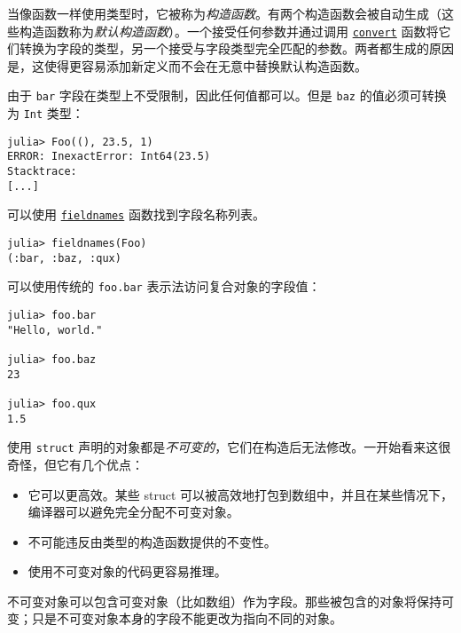当像函数一样使用类型时，它被称为\emph{构造函数}。有两个构造函数会被自动生成（这些构造函数称为\emph{默认构造函数}）。一个接受任何参数并通过调用 \hyperlink{1846942650946171605}{\texttt{convert}} 函数将它们转换为字段的类型，另一个接受与字段类型完全匹配的参数。两者都生成的原因是，这使得更容易添加新定义而不会在无意中替换默认构造函数。



由于 \texttt{bar} 字段在类型上不受限制，因此任何值都可以。但是 \texttt{baz} 的值必须可转换为 \texttt{Int} 类型：




\begin{verbatim}
julia> Foo((), 23.5, 1)
ERROR: InexactError: Int64(23.5)
Stacktrace:
[...]
\end{verbatim}



可以使用 \hyperlink{17481253338332315021}{\texttt{fieldnames}} 函数找到字段名称列表。




\begin{verbatim}
julia> fieldnames(Foo)
(:bar, :baz, :qux)
\end{verbatim}



可以使用传统的 \texttt{foo.bar} 表示法访问复合对象的字段值：




\begin{verbatim}
julia> foo.bar
"Hello, world."

julia> foo.baz
23

julia> foo.qux
1.5
\end{verbatim}



使用 \texttt{struct} 声明的对象都是\emph{不可变的}，它们在构造后无法修改。一开始看来这很奇怪，但它有几个优点：



\begin{itemize}
\item 它可以更高效。某些 struct 可以被高效地打包到数组中，并且在某些情况下，编译器可以避免完全分配不可变对象。


\item 不可能违反由类型的构造函数提供的不变性。


\item 使用不可变对象的代码更容易推理。

\end{itemize}


不可变对象可以包含可变对象（比如数组）作为字段。那些被包含的对象将保持可变；只是不可变对象本身的字段不能更改为指向不同的对象。




